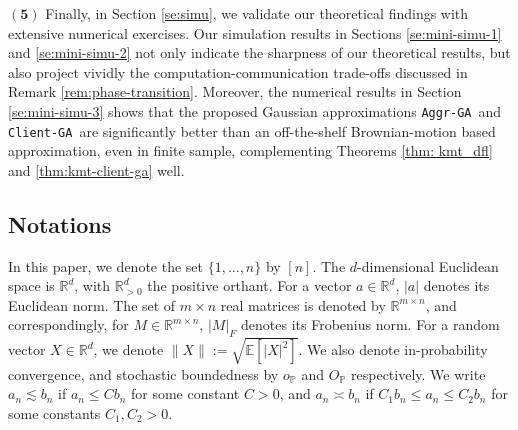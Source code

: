 \documentclass[a4paper,11pt]{article}
\numberwithin{equation}{section}
\theoremstyle{plain}
\theoremstyle{remark}
\def\IE{\mathbb{E}}
\def\R{\mathbb{R}}
\newcommand{\IP}{\mathbb{P}}
\newcommand{\ag}{\texttt{Aggr-GA}}
\newcommand{\cg}{\texttt{Client-GA}}
\begin{document}
    \noindent $\mathbf{(5)}$ Finally, in Section \ref{se:simu}, we validate our theoretical findings with extensive numerical exercises. Our simulation results in Sections \ref{se:mini-simu-1} and \ref{se:mini-simu-2} not only indicate the sharpness of our theoretical results, but also project vividly the computation-communication trade-offs discussed in Remark \ref{rem:phase-transition}. Moreover, the numerical results in Section \ref{se:mini-simu-3} shows that the proposed Gaussian approximations \ag\ and \cg\ are significantly better than an off-the-shelf Brownian-motion based approximation, even in finite sample, complementing Theorems \ref{thm: kmt_dfl} and \ref{thm:kmt-client-ga} well. 

\subsection{Notations}\label{se:notations}

In this paper, we denote the set $\{1, \ldots, n\}$ by $[n]$. The $d$-dimensional Euclidean space is $\R^d$, with $\R^d_{>0}$ the positive orthant. For a vector $a \in \R^d$, $|a|$ denotes its Euclidean norm. The set of $m \times n$ real matrices is denoted by $\R^{m \times n}$, and correspondingly, for $M \in \R^{m\times n}$, $|M|_F$ denotes its Frobenius norm. For a random vector $X \in \R^d$, we denote $\|X\|:=\sqrt{\IE[|X|^2]}$. We also denote in-probability convergence, and stochastic boundedness by $o_{\IP}$ and $O_{\IP}$ respectively. We write $a_n \lesssim b_n$ if $a_n \le C b_n$ for some constant $C > 0$, and $a_n \asymp b_n$ if $C_1 b_n \le a_n \le C_2 b_n$ for some constants $C_1, C_2 > 0$.

\end{document}
